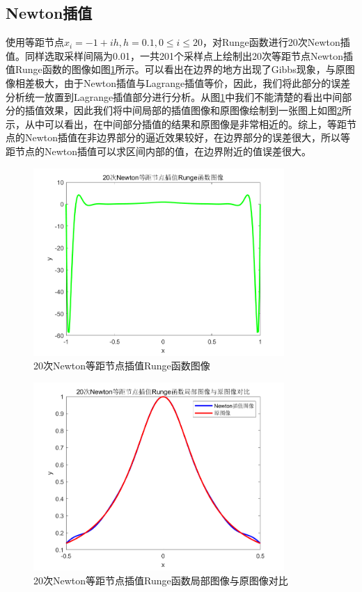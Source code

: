 \documentclass[a4paper]{article}
\begin{document}
\subsection{Newton插值}
使用等距节点$x_i=-1+ih,h=0.1,0\le i\le 20$，对Runge函数进行20次Newton插值。同样选取采样间隔为0.01，一共201个采样点上绘制出20次等距节点Newton插值Runge函数的图像如图\ref{fig:2}所示。可以看出在边界的地方出现了Gibbs现象，与原图像相差极大，由于Newton插值与Lagrange插值等价，因此，我们将此部分的误差分析统一放置到Lagrange插值部分进行分析。从图\ref{fig:2}中我们不能清楚的看出中间部分的插值效果，因此我们将中间局部的插值图像和原图像绘制到一张图上如图\ref{fig:3}所示，从中可以看出，在中间部分插值的结果和原图像是非常相近的。综上，等距节点的Newton插值在非边界部分的逼近效果较好，在边界部分的误差很大，所以等距节点的Newton插值可以求区间内部的值，在边界附近的值误差很大。
\begin{figure}[!h]
	\centering
	\includegraphics[width=0.85\textwidth]{../code/result/newtonrunge}
	\caption{\label{fig:2}20次Newton等距节点插值Runge函数图像}
\end{figure}

\begin{figure}[!h]
	\centering
	\includegraphics[width=0.85\textwidth]{../code/result/newtonrunge2}
	\caption{\label{fig:3}20次Newton等距节点插值Runge函数局部图像与原图像对比}
\end{figure}
\end{document}
